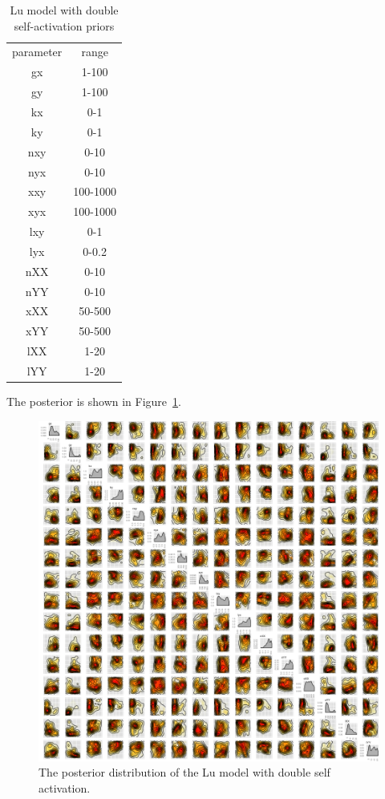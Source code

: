 \begin{table}[htbp]
\centering
\caption{Lu model with double self-activation priors}
\label{tab:lu_dp_pr}
\begin{tabular}{cc}
parameter & range \\
gx & 1-100 \\
gy & 1-100 \\
kx & 0-1 \\
ky & 0-1 \\
nxy & 0-10 \\
nyx & 0-10 \\
xxy & 100-1000 \\
xyx & 100-1000 \\
lxy & 0-1 \\
lyx & 0-0.2 \\
nXX & 0-10  \\
nYY & 0-10 \\
xXX & 50-500 \\
xYY & 50-500 \\
lXX & 1-20 \\
lYY & 1-20
\end{tabular}
\end{table}

The posterior is shown in Figure~\ref{fig:lu_tristable}. 
\begin{figure}[h]
\centering
\includegraphics[scale=0.4]{chapterStabilityFinder/Lu_switches/images/double_pos/posterior_tri_wide_params.png}
\caption[The posterior distribution of the Lu model with double self activation]{The posterior distribution of the Lu model with double self activation.}
\label{fig:lu_tristable}
\end{figure}


